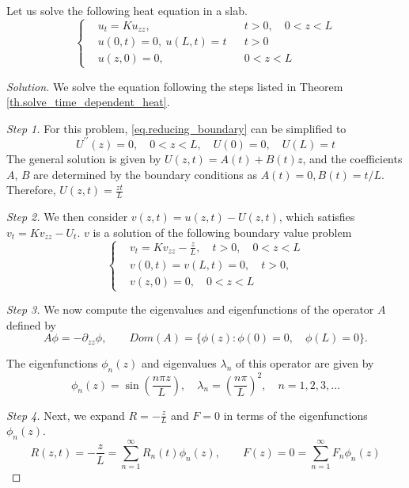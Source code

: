 \begin{example}
    Let us solve the following heat equation in a slab.
    \begin{equation}
        \left\{
        \begin{aligned}
            &u_t=K u_{z z},\quad && t>0, \quad 0<z<L \\
            &u(0, t)=0,\ u(L, t)=t && t>0 \\
            &u(z, 0)=0,\quad && 0<z<L
        \end{aligned}
        \right.
    \end{equation}
\end{example}
\begin{proof}[Solution] We solve the equation following the steps listed in Theorem \ref{th.solve_time_dependent_heat}.

\textit{Step 1.} For this problem, \eqref{eq.reducing_boundary} can be simplified to 
$$
U^{\prime \prime}(z)=0, \quad 0<z<L, \quad U(0)=0, \quad U(L)=t
$$
The general solution is given by $U(z, t)=A(t)+B(t)z$, and the coefficients $A$, $B$ are determined by the boundary conditions as $A(t)=0, B(t)=t/L$. Therefore, $U(z, t)=\frac{zt}{L}$
    
\textit{Step 2.} We then consider $v(z, t)=u(z, t)-U(z, t)$, which satisfies $v_t = Kv_{zz} - U_t$. $v$ is a solution of the following boundary value problem
\begin{equation}\label{eq.sol_ex_time_independent_0}
    \left\{\begin{aligned}
    & v_t=K v_{z z} - \frac{z}{L}, \quad t>0, \quad 0<z<L 
    \\
    & v(0, t)=v(L, t)=0, \quad t>0, 
    \\
    &v(z, 0)=0, \quad 0<z<L
    \end{aligned}\right.
\end{equation}

\textit{Step 3.} We now compute the eigenvalues and eigenfunctions of the operator $A$ defined by
\[
    A \phi = -\partial_{zz} \phi,\qquad \textit{Dom}(A) = \{\phi(z): \phi(0) = 0, \quad \phi(L) = 0\}.
\]

The eigenfunctions $\phi_n(z)$ and eigenvalues $\lambda_n$ of this operator are given by
\[
    \phi_n(z) = \sin\left( \frac{n \pi z}{L} \right), \quad \lambda_n = \left( \frac{n \pi}{L} \right)^2, \quad n = 1, 2, 3, \dots
\]

\textit{Step 4.} Next, we expand $R = -\frac{z}{L}$ and $F = 0$ in terms of the eigenfunctions $\phi_n(z)$. 
\begin{equation}\label{eq.sol_ex_time_independent_1}
    R(z, t) = -\frac{z}{L} = \sum_{n=1}^\infty R_n(t) \phi_n(z),\qquad F(z) = 0 = \sum_{n=1}^\infty F_n \phi_n(z)
\end{equation}


\end{proof}
